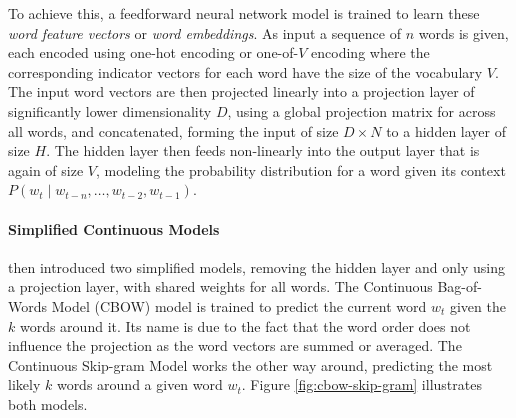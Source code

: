To achieve this, a feedforward neural network model is trained to learn these \emph{word feature vectors} or \emph{word embeddings}. As input a sequence of $n$ words is given, each encoded using one-hot encoding or one-of-$V$ encoding where the corresponding indicator vectors for each word have the size of the vocabulary $V$. The input word vectors are then projected linearly into a projection layer of significantly lower dimensionality $D$, using a global projection matrix for across all words, and concatenated, forming the input of size $D \times N$ to a hidden layer of size $H$. The hidden layer then feeds non-linearly into the output layer that is again of size $V$, modeling the probability distribution for a word given its context $P(w_t \mid w_{t - n}, \ldots, w_{t - 2}, w_{t - 1})$.

\paragraph{Simplified Continuous Models}

\cite{Mikolov:2013ad} then introduced two simplified models, removing the hidden layer and only using a projection layer, with shared weights for all words. The Continuous Bag-of-Words Model (CBOW) model is trained to predict the current word $w_t$ given the $k$ words around it. Its name is due to the fact that the word order does not influence the projection as the word vectors are summed or averaged. The Continuous Skip-gram Model works the other way around, predicting the most likely $k$ words around a given word $w_t$. Figure \ref{fig:cbow-skip-gram} illustrates both models.

